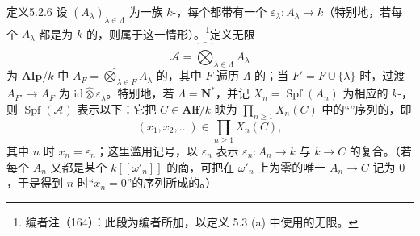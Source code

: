 \begin{SGAresult}{定义}{5.2.6}
设 $(A_\lambda)_{\lambda\in\Lambda}$ 为一族 $k$-，每个都带有一个 $\varepsilon_\lambda:A_\lambda\to k$（特别地，若每个 $A_\lambda$ 都是为 $k$ 的，则属于这一情形）。\footnote{编者注（164）：此段为编者所加，以定义 5.3 (a) 中使用的无限。}定义无限
\[\mathscr A=\widehat{\bigotimes}_{\lambda\in\Lambda}A_\lambda\]
为 $\mathbf{Alp}/k$ 中 $A_F=\widehat{\bigotimes}_{\lambda\in F}A_\lambda$ 的，其中 $F$ 遍历 $\Lambda$ 的；当 $F'=F\cup\{\lambda\}$ 时，过渡 $A_{F'}\to A_F$ 为 $\mathrm{id}\widehat\otimes\varepsilon_\lambda$。特别地，若 $\Lambda=\mathbf N^*$，并记 $X_n=\operatorname{Spf}(A_n)$ 为相应的 $k$-，则 $\operatorname{Spf}(\mathscr A)$ 表示以下：它把 $C\in\mathbf{Alf}/k$ 映为 $\prod_{n\geq1}X_n(C)$ 中的“”序列的，即
\[(x_1,x_2,\ldots)\in\prod_{n\geq1}X_n(C),\]
其中 $n$ 时 $x_n=\varepsilon_n$；这里滥用记号，以 $\varepsilon_n$ 表示 $\varepsilon_n:A_n\to k$ 与 $k\to C$ 的复合。（若每个 $A_n$ 又都是某个 $k[[\omega'_n]]$ 的商，可把在 $\omega'_n$ 上为零的唯一 $A_n\to C$ 记为 $0$，于是得到 $n$ 时“$x_n=0$”的序列所成的。）
\end{SGAresult}

